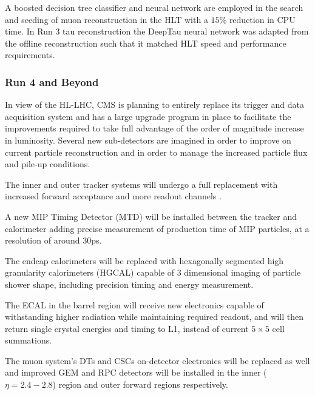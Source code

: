 A boosted decision tree classifier and neural network are employed in the search and seeding of muon reconstruction in the HLT\cite{cms2023development} with a $15\%$ reduction in CPU time. In Run 3 tau reconstruction the DeepTau\cite{cms2022identification} neural network was adapted from the offline reconstruction such that it matched HLT speed and performance requirements.

 




\subsubsection{Run 4 and Beyond}

In view of the HL-LHC, CMS is planning to entirely replace its trigger and data acquisition system and has a large upgrade program in place to facilitate the improvements required to take full advantage of the order of magnitude increase in luminosity. Several new sub-detectors are imagined in order to improve on current particle reconstruction and in order to manage the increased particle flux and pile-up conditions. 
\vspace{12pt}

The inner and outer tracker systems will undergo a full replacement with increased forward acceptance and more readout channels \cite{collaboration2017phasecms}. 
\par
A new MIP Timing Detector (MTD) will be installed between the tracker and calorimeter adding precise measurement of production time of MIP particles, at a resolution of around $30$ps\cite{cms2019mip}. 
\par
The endcap calorimeters will be replaced with hexagonally segmented high granularity calorimeters (HGCAL) capable of $3$ dimensional imaging of particle shower shape, including precision timing and energy measurement\cite{cms2017phase-hgcal,magnan2017hgcalcms,martelli2017cms,lobanov2020precisioncms}.
\par
The ECAL in the barrel region will receive new electronics capable of withstanding higher radiation while maintaining required readout, and will then return single crystal energies and timing to L1, instead of current $5\times 5$ cell summations\cite{cms2017phase-ecal}.
\par
The muon system's DTs and CSCs on-detector electronics will be replaced as well and improved GEM and RPC detectors will be installed in the inner ($\eta=2.4 - 2.8$) region and outer forward regions respectively\cite{cmsphase-muons,colaleo2015cms}. 
\vspace{12pt}



